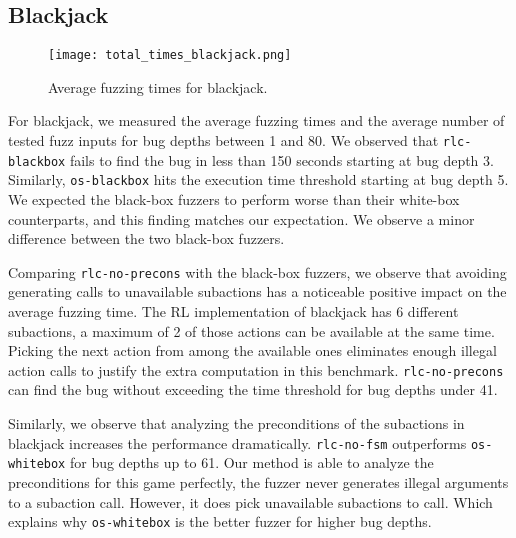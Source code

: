 \subsection{Blackjack}
\begin{figure}[h]
    \centering
    \texttt{[image: total\_times\_blackjack.png]}
    \caption{Average fuzzing times for blackjack.}
    \label{totalTimesBlackjack}
\end{figure}
For blackjack, we measured the average fuzzing times and the average number of tested fuzz inputs for bug depths between 1 and 80.
We observed that \texttt{rlc-blackbox} fails to find the bug in less than 150 seconds starting at bug depth 3.
Similarly, \texttt{os-blackbox} hits the execution time threshold starting at bug depth 5.
We expected the black-box fuzzers to perform worse than their white-box counterparts, and this finding matches our expectation.
We observe a minor difference between the two black-box fuzzers.

Comparing \texttt{rlc-no-precons} with the black-box fuzzers, we observe that avoiding generating calls to unavailable subactions has a noticeable
positive impact on the average fuzzing time.
The RL implementation of blackjack has 6 different subactions, a maximum of 2 of those actions can be available at the same time.
Picking the next action from among the available ones eliminates enough illegal action calls to justify the extra computation in this benchmark.
\texttt{rlc-no-precons} can find the bug without exceeding the time threshold for bug depths under 41.

Similarly, we observe that analyzing the preconditions of the subactions in blackjack increases the performance dramatically.
\texttt{rlc-no-fsm} outperforms \texttt{os-whitebox} for bug depths up to 61.
Our method is able to analyze the preconditions for this game perfectly, the fuzzer never generates illegal arguments to a subaction call.
However, it does pick unavailable subactions to call.
Which explains why \texttt{os-whitebox} is the better fuzzer for higher bug depths.

